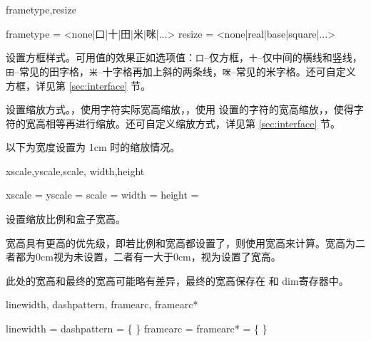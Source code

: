 \documentclass{ctxdoc}
\begin{document}
\begin{function}{frametype,resize}
  \begin{syntax}
    frametype = <none|口|十|田|米|咪|...> 
    resize    = <none|real|base|square|...> 
  \end{syntax}
   设置方框样式。可用值的效果正如选项值：\verb|口|--仅方框，\verb|十|--仅中间的横线和竖线，\verb|田|--常见的田字格，\verb|米|--十字格再加上斜的两条线，\verb|咪|--常见的米字格。还可自定义方框，详见第 \ref{sec:interface} 节。

  {
  }

   设置缩放方式。，使用字符实际宽高缩放，，使用  设置的字符的宽高缩放，，使得字符的宽高相等再进行缩放。还可自定义缩放方式，详见第 \ref{sec:interface} 节。

  以下为宽度设置为 1cm 时的缩放情况。
  {
  }
\end{function}

\begin{function}{
  xscale,yscale,scale,
  width,height
}
  \begin{syntax}
    xscale =  
    yscale =  
    scale  = 
    width  = 
    height = 
  \end{syntax}
  设置缩放比例和盒子宽高。

  宽高具有更高的优先级，即若比例和宽高都设置了，则使用宽高来计算。宽高为二者都为0cm视为未设置，二者有一大于0cm，视为设置了宽高。

  此处的宽高和最终的宽高可能略有差异，最终的宽高保存在  和  dim寄存器中。
\end{function}

\begin{function}{
  linewidth,
  dashpattern,
  framearc,
  framearc*
}
  \begin{syntax}
    linewidth   =  \init{0.4pt}
    dashpattern = \{  \}
    framearc    = 
    framearc*   = \{   \}
  \end{syntax}
\end{function}
\end{document}
